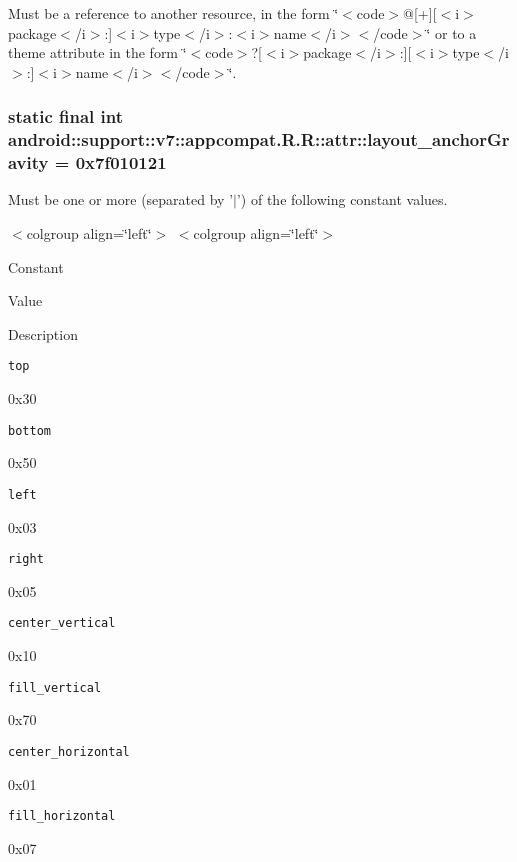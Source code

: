 Must be a reference to another resource, in the form \char`\"{}$<$code$>$@\mbox{[}+\mbox{]}\mbox{[}$<$i$>$package$<$/i$>$:\mbox{]}$<$i$>$type$<$/i$>$:$<$i$>$name$<$/i$>$$<$/code$>$\char`\"{} or to a theme attribute in the form \char`\"{}$<$code$>$?\mbox{[}$<$i$>$package$<$/i$>$:\mbox{]}\mbox{[}$<$i$>$type$<$/i$>$:\mbox{]}$<$i$>$name$<$/i$>$$<$/code$>$\char`\"{}. \hypertarget{classandroid_1_1support_1_1v7_1_1appcompat_1_1_r_1_1attr_4c02ef593578f0fd5c2d03bf766a3956}{
\subsubsection[{layout\_\-anchorGravity}]{\setlength{\rightskip}{0pt plus 5cm}static final int android::support::v7::appcompat.R.R::attr::layout\_\-anchorGravity = 0x7f010121}}
\label{classandroid_1_1support_1_1v7_1_1appcompat_1_1_r_1_1attr_4c02ef593578f0fd5c2d03bf766a3956}


Must be one or more (separated by '$|$') of the following constant values. \begin{TabularC}{0}
\hline
\end{TabularC}
$<$colgroup align=\char`\"{}left\char`\"{}$>$ $<$colgroup align=\char`\"{}left\char`\"{}$>$ 

Constant

Value

Description 

{\tt top}

0x30

{\tt bottom}

0x50

{\tt left}

0x03

{\tt right}

0x05

{\tt center\_\-vertical}

0x10

{\tt fill\_\-vertical}

0x70

{\tt center\_\-horizontal}

0x01

{\tt fill\_\-horizontal}

0x07

